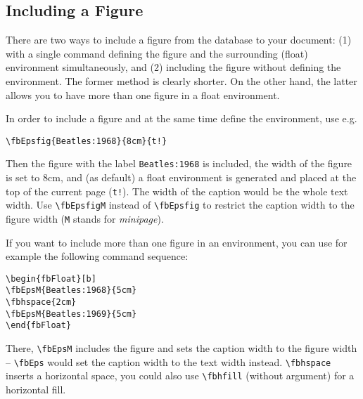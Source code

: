 \documentclass{ltxdoc}
\begin{document}
\subsection{Including a Figure}\label{include}

There are two ways to include a figure from the database to your
document: (1) with a single command defining the figure and the
surrounding (float) environment simultaneously, and (2) including
the figure without defining the environment. The former method is
clearly shorter. On the other hand, the latter allows you to have
more than one figure in a float environment.

\DescribeMacro{\fbEpsfig}
\DescribeMacro{\fbEpsfigM}
In order to include a figure and at the same time define the
environment, use e.g.
\begin{verbatim}
\fbEpsfig{Beatles:1968}{8cm}{t!}
\end{verbatim}
Then the figure with the label \texttt{Beatles:1968} is included,
the width of the figure is set to 8cm, and (as default) a float
environment is generated and placed at the top of the current page
(\texttt{t!}). The width of the caption would be the whole text
width. Use \verb+\fbEpsfigM+ instead of
\verb+\fbEpsfig+ to restrict the caption width to the figure
width (\texttt{M} stands for \emph{minipage}).

\DescribeMacro{\fbEps}
\DescribeMacro{\fbEpsM}
\DescribeMacro{\fbhspace}
\DescribeMacro{\fbhfill}
If you want to include more than one figure in an environment, you
can use for example the following command sequence:
\begin{verbatim}
\begin{fbFloat}[b]
\fbEpsM{Beatles:1968}{5cm}
\fbhspace{2cm}
\fbEpsM{Beatles:1969}{5cm}
\end{fbFloat}
\end{verbatim}
There, \verb+\fbEpsM+ includes the figure and sets the caption
width to the figure width -- \verb+\fbEps+ would set the caption
width to the text width instead. \verb+\fbhspace+ inserts a
horizontal space, you could also use \verb+\fbhfill+ (without
argument) for a horizontal fill.
\end{document}

